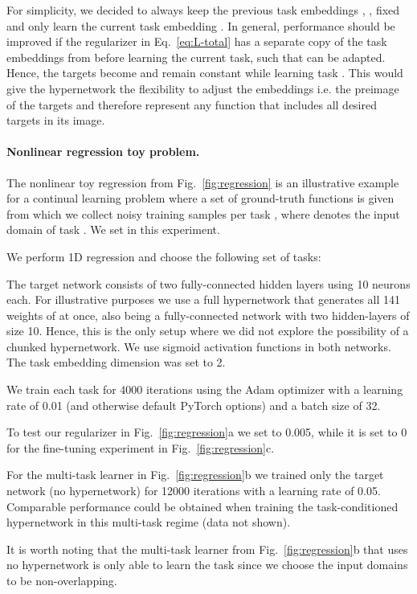 \documentclass{article}
\begin{document}
For simplicity, we decided to always keep the previous task embeddings , , fixed and only learn the current task embedding . In general, performance should be improved if the regularizer in Eq.~\ref{eq:L-total} has a separate copy of the task embeddings  from before learning the current task, such that  can be adapted. Hence, the targets become  and remain constant while learning task . This would give the hypernetwork the flexibility to adjust the embeddings i.e. the preimage of the targets and therefore represent any function that includes all desired targets in its image.

\paragraph{Nonlinear regression toy problem.}

The nonlinear toy regression from Fig.~\ref{fig:regression} is an illustrative example for a continual learning problem where a set of ground-truth functions  is given from which we collect  noisy training samples per task , where  denotes the input domain of task . We set  in this experiment. 

We perform 1D regression and choose the following set of tasks:



The target network  consists of two fully-connected hidden layers using 10 neurons each. For illustrative purposes we use a full hypernetwork  that generates all 141 weights of  at once, also being a fully-connected network with two hidden-layers of size 10. Hence, this is the only setup where we did not explore the possibility of a chunked hypernetwork. We use sigmoid activation functions in both networks. The task embedding dimension was set to 2.

We train each task for 4000 iterations using the Adam optimizer with a learning rate of 0.01 (and otherwise default PyTorch options) and a batch size of 32.

To test our regularizer in Fig.~\ref{fig:regression}a we set  to 0.005, while it is set to 0 for the fine-tuning experiment in Fig.~\ref{fig:regression}c.

For the multi-task learner in Fig.~\ref{fig:regression}b we trained only the target network (no hypernetwork) for 12000 iterations with a learning rate of 0.05. Comparable performance could be obtained when training the task-conditioned hypernetwork in this multi-task regime (data not shown).

It is worth noting that the multi-task learner from Fig.~\ref{fig:regression}b that uses no hypernetwork is only able to learn the task since we choose the input domains to be non-overlapping.
\end{document}
